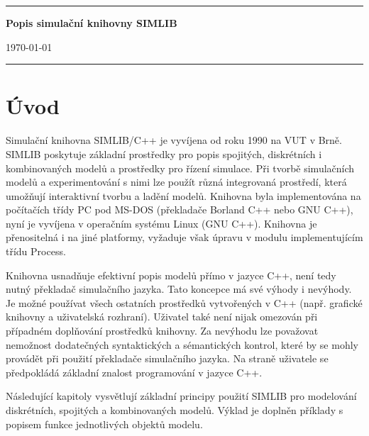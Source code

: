 \documentclass[a4paper]{article}
\begin{document}
 

\begin{titlepage}
\hrule
\vfill
\begin{center}

            {\Huge\bf Popis simulační knihovny SIMLIB\\}


\bigskip                    \today

\end{center}
\vfill
\hrule
\end{titlepage}

\pagebreak

\tableofcontents

\pagebreak

\section{Úvod}

Simulační knihovna SIMLIB/C++ je vyvíjena od roku 1990 na VUT v Brně. 
SIMLIB poskytuje základní prostředky pro popis spojitých, diskrétních i
kombinovaných modelů a prostředky pro řízení simulace. Při tvorbě simulačních
modelů a experimentování s nimi lze použít různá integrovaná prostředí, která 
umožňují interaktivní tvorbu a ladění modelů. 
Knihovna byla implementována na počítačích třídy PC pod MS-DOS (překladače
Borland C++ nebo GNU C++), nyní je vyvíjena v operačním systému Linux (GNU
C++). Knihovna je přenositelná i na jiné platformy, vyžaduje však úpravu v
modulu implementujícím třídu Process.

Knihovna usnadňuje efektivní popis modelů přímo v jazyce C++,
není tedy nutný překladač simulačního jazyka. Tato koncepce má
své výhody i nevýhody. Je možné používat všech ostatních
prostředků vytvořených v C++ (např. grafické knihovny
a uživatelská rozhraní). Uživatel také není nijak omezován při
případném doplňování prostředků knihovny. Za nevýhodu lze
považovat nemožnost dodatečných syntaktických a sémantických
kontrol, které by se mohly provádět při použití překladače
simulačního jazyka. Na straně uživatele se předpokládá základní
znalost programování v jazyce C++.

Následující kapitoly vysvětlují základní principy použití SIMLIB pro
modelování diskrétních, spojitých a kombinovaných modelů. Výklad
je doplněn příklady s popisem funkce jednotlivých objektů
modelu.
\end{document}
